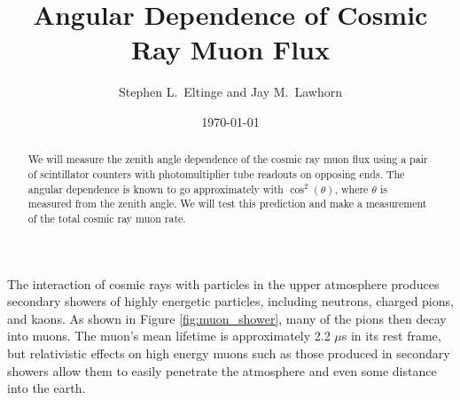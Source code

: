 \usepackage{lgrind} %
\usepackage{chapterbib} %
\usepackage{color} %
\usepackage{graphics}      %
\usepackage[pdftex]{graphicx} %
\usepackage{longtable}     %
\usepackage{epsf} %
\usepackage{bm}            %
\usepackage{thumbpdf}
\usepackage[colorlinks=true]{hyperref} %
\usepackage{multirow}
\usepackage{subfigure}

\newcommand{\cd}{$\cdot$}

%
%


\title{Angular Dependence of Cosmic Ray Muon Flux}
\author{Stephen L.\ Eltinge and Jay M.\ Lawhorn}
\date{\today}

\begin{abstract}
We will measure the zenith angle dependence of the cosmic ray muon flux using a pair of scintillator counters with photomultiplier tube readouts on opposing ends. The angular dependence is known to go approximately with $\cos^2(\theta)$, where $\theta$ is measured from the zenith angle. We will test this prediction and make a measurement of the total cosmic ray muon rate.
\end{abstract}

\maketitle

The interaction of cosmic rays with particles in the upper atmosphere produces secondary showers of highly energetic particles, including neutrons, charged pions, and kaons. As shown in Figure \ref{fig:muon_shower}, many of the pions then decay into muons. The muon's mean lifetime is approximately 2.2 $\mu$s in its rest frame, but relativistic effects on high energy muons such as those produced in secondary showers allow them to easily penetrate the atmosphere and even some distance into the earth.


